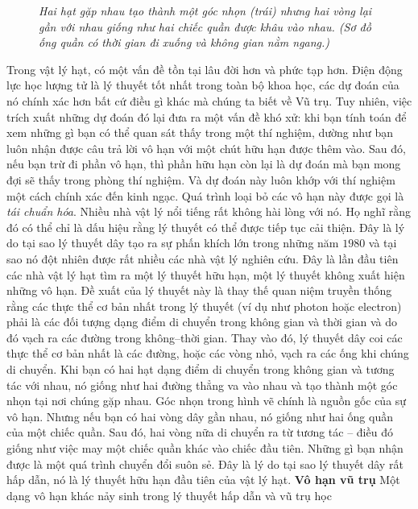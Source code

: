 \begin{multicols}{2}
\begin{figure}[H]
		\caption{\small\textit{\color{quantoan}Hai hạt gặp nhau tạo thành một góc nhọn (trái) nhưng
				hai vòng lại gần với nhau giống như hai chiếc quần được khâu vào nhau. (Sơ đồ
				ống quần có thời gian đi xuống và không gian nằm ngang.)}}
		\vspace*{-10pt}
	\end{figure}
	Trong vật lý hạt, có một vấn đề tồn tại lâu đời hơn và phức tạp hơn. Điện
	động lực học lượng tử là lý thuyết tốt nhất trong toàn bộ khoa học, các dự
	đoán của nó chính xác hơn bất cứ điều gì khác mà chúng ta biết về Vũ trụ. Tuy
	nhiên, việc trích xuất những dự đoán đó lại đưa ra một vấn đề khó xử: khi bạn
	tính toán để xem những gì bạn có thể quan sát thấy trong một thí nghiệm,
	dường như bạn luôn nhận được câu trả lời vô hạn với một chút hữu hạn được thêm
	vào. Sau đó, nếu bạn trừ đi phần vô hạn, thì phần hữu hạn còn lại là dự
	đoán mà bạn mong đợi sẽ thấy trong phòng thí nghiệm. Và dự đoán này luôn
	khớp với thí nghiệm một cách chính xác đến kinh ngạc. 
	Quá trình loại bỏ các vô hạn này được gọi là \emph{tái chuẩn hóa}. 
	Nhiều nhà vật lý nổi tiếng rất không hài lòng với nó.
	Họ nghĩ rằng đó có thể chỉ là dấu hiệu rằng lý thuyết có thể
	được tiếp tục cải thiện.
	\vskip 0.05cm
	Đây là lý do tại sao lý thuyết dây tạo ra sự phấn khích lớn trong những năm
	$1980$ và tại sao nó đột nhiên được rất nhiều các nhà vật lý nghiên cứu.
	Đây là lần đầu tiên các nhà vật lý hạt tìm ra một lý thuyết hữu hạn, một
	lý thuyết không xuất hiện những vô hạn. Đề xuất của lý thuyết này là thay thế
	quan niệm truyền thống rằng các thực thể cơ bản nhất trong lý thuyết (ví dụ
	như photon hoặc electron) phải là các đối tượng dạng điểm di chuyển trong
	không gian và thời gian và do đó vạch ra các đường trong không--thời gian.
	Thay vào đó, lý thuyết dây coi các thực thể cơ bản nhất là các đường, hoặc các
	vòng nhỏ, vạch ra các ống khi chúng di chuyển. Khi bạn có hai hạt dạng điểm
	di chuyển trong không gian và tương tác với nhau, nó giống như hai đường thẳng
	va vào nhau và tạo thành một góc nhọn tại nơi chúng gặp nhau. 
	Góc nhọn trong hình vẽ chính là nguồn gốc của sự vô hạn.
	Nhưng nếu bạn có
	hai vòng dây gần nhau, nó giống như hai ống quần của một chiếc quần. Sau đó,
	hai vòng nữa di chuyển ra từ tương tác -- điều đó giống như việc may một
	chiếc quần khác vào chiếc đầu tiên. Những gì bạn nhận được là một quá trình
	chuyển đổi suôn sẻ. Đây là lý do tại sao lý thuyết dây rất hấp dẫn, nó là lý
	thuyết hữu hạn đầu tiên của vật lý hạt.
	\vskip 0.05cm
	\textbf{\color{quantoan}Vô hạn vũ trụ} 
	\vskip 0.05cm
	Một dạng vô hạn khác nảy sinh trong lý thuyết hấp dẫn và vũ trụ học

\end{multicols}
